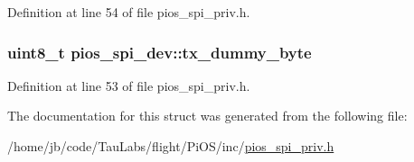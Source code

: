 \-Definition at line 54 of file pios\-\_\-spi\-\_\-priv.\-h.

\hypertarget{structpios__spi__dev_a72b66190a7211a66c58fdc359c742438}{
\subsubsection[{tx\-\_\-dummy\-\_\-byte}]{\setlength{\rightskip}{0pt plus 5cm}uint8\-\_\-t {\bf pios\-\_\-spi\-\_\-dev\-::tx\-\_\-dummy\-\_\-byte}}}\label{structpios__spi__dev_a72b66190a7211a66c58fdc359c742438}


\-Definition at line 53 of file pios\-\_\-spi\-\_\-priv.\-h.



\-The documentation for this struct was generated from the following file\-:\begin{DoxyCompactItemize}
\item 
/home/jb/code/\-Tau\-Labs/flight/\-Pi\-O\-S/inc/\hyperlink{pios__spi__priv_8h}{pios\-\_\-spi\-\_\-priv.\-h}\end{DoxyCompactItemize}
